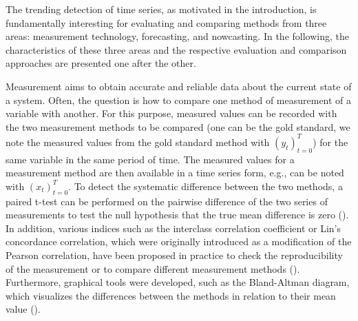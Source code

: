 
The trending detection of time series, as motivated in the introduction, is fundamentally interesting for evaluating and comparing methods from three areas: measurement technology, forecasting, and nowcasting. In the following, the characteristics of these three areas and the respective evaluation and comparison approaches are presented one after the other.

Measurement aims to obtain accurate and reliable data about the current state of a system.
Often, the question is how to compare one method of measurement of a variable with another.
For this purpose, measured values can be recorded with the two measurement methods to be compared (one can be the gold standard, we note the measured values from the gold standard method with $(y_t)^T_{t=0}$) for the same variable in the same period of time. 
The measured values for a measurement method are then available in a time series form, e.g., can be noted with $(x_t)^T_{t=0}$. 
To detect the systematic difference between the two methods, a paired t-test can be performed on the pairwise difference of the two series of measurements to test the null hypothesis that the true mean difference is zero (\cite{watson2010method}).
In addition, various indices such as the interclass correlation coefficient or Lin's concordance correlation, which were originally introduced as a modification of the Pearson correlation, have been proposed in practice to check the reproducibility of the measurement or to compare different measurement methods (\cite{lawrence1989concordance,koo2016guideline,}). 
Furthermore, graphical tools were developed, such as the Bland-Altman diagram, which visualizes the differences between the methods in relation to their mean value (\cite{bland1986statistical}).

